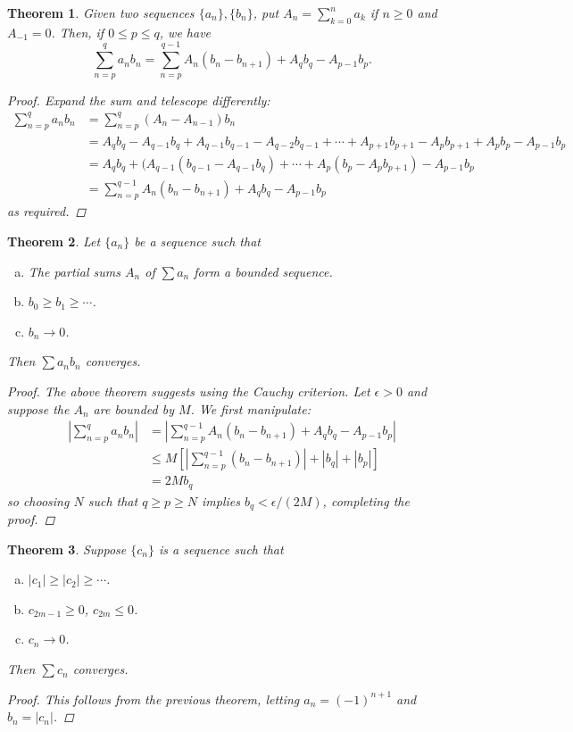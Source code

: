 \documentclass{scrbook}
\renewcommand{\to}{\rightarrow}
\newtheorem{theorem}{Theorem}
\begin{document}
\begin{theorem}
Given two sequences $\{a_n\}, \{b_n\}$, put $A_n = \sum_{k=0}^{n} a_k$ if $n \ge 0$ and $A_{-1} = 0$. Then, if $0 \le p \le q$, we have
\[
	\sum_{n=p}^{q} a_nb_n = \sum_{n=p}^{q-1} A_n(b_n - b_{n+1}) + A_qb_q - A_{p-1}b_p.
\]

\begin{proof}
Expand the sum and telescope differently:
\begin{align*}
\sum_{n=p}^{q} a_nb_n &= \sum_{n=p}^{q} (A_n - A_{n-1})b_n \\
	&= A_qb_q - A_{q-1}b_q + A_{q-1}b_{q-1} - A_{q-2}b_{q-1} + \dotsb + A_{p+1}b_{p+1} - A_pb_{p+1} + A_pb_p - A_{p-1}b_p \\
	&= A_qb_q + (A_{q-1}(b_{q-1} - A_{q-1}b_q) + \dotsb + A_p(b_p - A_pb_{p+1}) - A_{p-1}b_p \\
	&= \sum_{n=p}^{q-1} A_n(b_n - b_{n+1}) + A_qb_q - A_{p-1}b_p
\end{align*}
as required.
\end{proof}
\end{theorem}

\begin{theorem} %
Let $\{a_n\}$ be a sequence such that
\begin{enumerate}[(a)]
\item The partial sums $A_n$ of $\sum a_n$ form a bounded sequence.
\item $b_0 \ge b_1 \ge \dotsb$.
\item $b_n \to 0$.
\end{enumerate}
Then $\sum a_nb_n$ converges.

\begin{proof}
The above theorem suggests using the Cauchy criterion. Let $\epsilon > 0$ and suppose the $A_n$ are bounded by $M$. We first manipulate:
\begin{align*}
\left|\sum_{n=p}^{q} a_nb_n \right| &= \left|\sum_{n=p}^{q-1} A_n(b_n - b_{n+1}) + A_qb_q - A_{p-1}b_p\right| \\
	&\le M \left[\left|\sum_{n=p}^{q-1} (b_n - b_{n+1})\right| + |b_q| + |b_p|\right] \\
	&= 2Mb_q
\end{align*}
so choosing $N$ such that $q \ge p \ge N$ implies $b_q < \epsilon/(2M)$, completing the proof.
\end{proof}
\end{theorem}

\begin{theorem} %
Suppose $\{c_n\}$ is a sequence such that
\begin{enumerate}[(a)]
\item $|c_1| \ge |c_2| \ge \dotsb$.
\item $c_{2m-1} \ge 0$, $c_{2m} \le 0$.
\item $c_n \to 0$.
\end{enumerate}
Then $\sum c_n$ converges.

\begin{proof}
This follows from the previous theorem, letting $a_n = (-1)^{n+1}$ and $b_n = |c_n|$. 
\end{proof}
\end{theorem}
\end{document}
